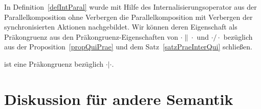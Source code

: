 In Definition~\ref{defIntParal} wurde mit Hilfe des Internalisierungsoperator
aus der Parallelkomposition ohne Verbergen die Parallelkomposition mit
Verbergen der synchronisierten Aktionen nachgebildet. Wir können deren
Eigenschaft als Präkongruenz aus den Präkongruenz-Eigenschaften von
$\cdot\|\cdot$ und $\cdot /\cdot$ bezüglich \QRel{} aus der
Proposition~\ref{propQuiPrae} und dem Satz~\ref{satzPraeInterQui} schließen.

\begin{kor}
  \QRel{} ist eine Präkongruenz bezüglich $\cdot |\cdot$.
\end{kor}

\section{Diskussion für andere Semantik}

